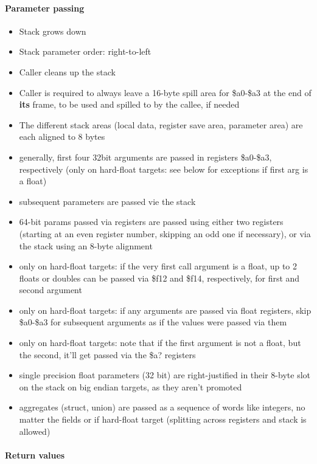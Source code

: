 \paragraph{Parameter passing}

\begin{itemize}
\item Stack grows down
\item Stack parameter order: right-to-left
\item Caller cleans up the stack
\item Caller is required to always leave a 16-byte spill area for \$a0-\$a3 at the end of {\bf its} frame, to be used and spilled to by the callee, if needed
\item The different stack areas (local data, register save area, parameter area) are each aligned to 8 bytes
\item generally, first four 32bit arguments are passed in registers \$a0-\$a3, respectively (only on hard-float targets: see below for exceptions if first arg is a float)
\item subsequent parameters are passed vie the stack
\item 64-bit params passed via registers are passed using either two registers (starting at an even register number, skipping an odd one if necessary), or via the stack using an 8-byte alignment
\item only on hard-float targets: if the very first call argument is a float, up to 2 floats or doubles can be passed via \$f12 and \$f14, respectively, for first and second argument
\item only on hard-float targets: if any arguments are passed via float registers, skip \$a0-\$a3 for subsequent arguments as if the values were passed via them
\item only on hard-float targets: note that if the first argument is not a float, but the second, it'll get passed via the \$a? registers
\item single precision float parameters (32 bit) are right-justified in their 8-byte slot on the stack on big endian targets, as they aren't promoted %
\item aggregates (struct, union) are passed as a sequence of words like integers, no matter the fields or if hard-float target (splitting across registers and stack is allowed)
\end{itemize}

\paragraph{Return values}

